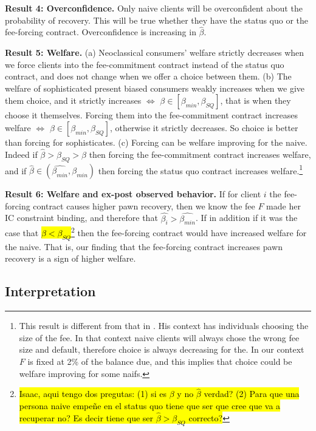 \documentclass[11pt]{article}
\begin{document}
\vspace{.1in}
\noindent \textbf{Result 4: Overconfidence.} Only naive clients will be overconfident about the probability of recovery. This will be true whether they have the status quo or the fee-forcing contract. Overconfidence is increasing in $\hat{\beta}$.

\vspace{.1in}
\noindent \textbf{Result 5: Welfare.} (a) Neoclassical consumers' welfare strictly decreases when we force clients into the fee-commitment contract instead of the status quo contract, and does not change when we offer a choice between them. (b) The welfare of sophisticated present biased consumers weakly increases when we give them choice, and it strictly increases  $\iff$  $\beta \in [\beta_{min},\beta_{SQ}]$, that is when they choose it themselves. Forcing them into the fee-commitment contract increases welfare $\iff$  $\beta \in [\beta_{min},\beta_{SQ}]$, otherwise it strictly decreases. So choice is better than forcing for sophisticates. (c) Forcing can be welfare improving for the naive. Indeed if $\hat{\beta}>\beta_{SQ}>\beta$ then forcing the fee-commitment contract increases welfare, and if $\hat{\beta} \in (\widehat{\beta_{min}},\beta_{min})$ then forcing the status quo contract increases welfare.\footnote{This result is different from that in \cite{John}. His context has individuals choosing the size of the fee. In that context naive clients will always chose the wrong fee size and default, therefore choice is always decreasing for the. In our context $F$ is fixed at 2\% of the balance due, and this implies that choice could be welfare improving for some naifs.}

\vspace{.1in}
\noindent \textbf{Result 6: Welfare and ex-post observed behavior.} If for client $i$ the fee-forcing contract causes higher pawn recovery, then we know the fee $F$ made her IC constraint binding, and therefore that $\hat{\beta_i}>\widehat{\beta_{min}}$. If in addition if it was the case that \hl{$\beta<\beta_{SQ}$}\footnote{\hl{Isaac, aqui tengo dos pregutas: (1) si es $\beta$ y no $\hat{\beta}$ verdad?  (2) Para que una persona naive empeñe en el status quo tiene que ser que cree que va a recuperar no? Es decir tiene que ser $\hat{\beta}>\beta_{SQ}$ correcto?}} then the fee-forcing contract would have increased welfare for the naive. That is, our finding that the fee-forcing contract increases pawn recovery is a sign of higher welfare.


\subsection{Interpretation}
\end{document}
